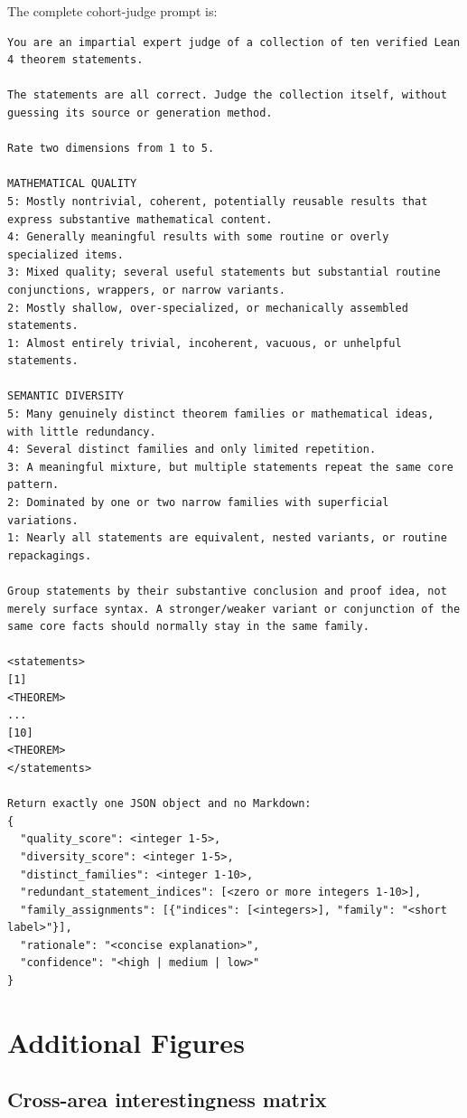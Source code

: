The complete cohort-judge prompt is:

\begin{lstlisting}[basicstyle=\ttfamily\footnotesize,breaklines=true]
You are an impartial expert judge of a collection of ten verified Lean 4 theorem statements.

The statements are all correct. Judge the collection itself, without guessing its source or generation method.

Rate two dimensions from 1 to 5.

MATHEMATICAL QUALITY
5: Mostly nontrivial, coherent, potentially reusable results that express substantive mathematical content.
4: Generally meaningful results with some routine or overly specialized items.
3: Mixed quality; several useful statements but substantial routine conjunctions, wrappers, or narrow variants.
2: Mostly shallow, over-specialized, or mechanically assembled statements.
1: Almost entirely trivial, incoherent, vacuous, or unhelpful statements.

SEMANTIC DIVERSITY
5: Many genuinely distinct theorem families or mathematical ideas, with little redundancy.
4: Several distinct families and only limited repetition.
3: A meaningful mixture, but multiple statements repeat the same core pattern.
2: Dominated by one or two narrow families with superficial variations.
1: Nearly all statements are equivalent, nested variants, or routine repackagings.

Group statements by their substantive conclusion and proof idea, not merely surface syntax. A stronger/weaker variant or conjunction of the same core facts should normally stay in the same family.

<statements>
[1]
<THEOREM>
...
[10]
<THEOREM>
</statements>

Return exactly one JSON object and no Markdown:
{
  "quality_score": <integer 1-5>,
  "diversity_score": <integer 1-5>,
  "distinct_families": <integer 1-10>,
  "redundant_statement_indices": [<zero or more integers 1-10>],
  "family_assignments": [{"indices": [<integers>], "family": "<short label>"}],
  "rationale": "<concise explanation>",
  "confidence": "<high | medium | low>"
}
\end{lstlisting}
\clearpage

\section{Additional Figures}

\subsection{Cross-area interestingness matrix}
\label{app:interestingness}

